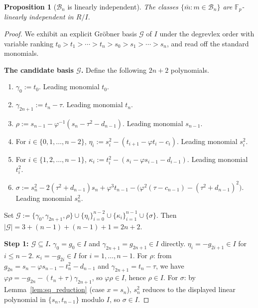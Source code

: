 \documentclass[11pt,a4paper]{article}
\newtheorem{proposition}[theorem]{Proposition}
\theoremstyle{definition}
\newcommand{\F}{\mathbb{F}}
\begin{document}
\begin{proposition}[$\mathcal{B}_n$ is linearly independent]\label{prop:indep}
The classes $\{\bar m : m \in \mathcal{B}_n\}$ are $\F_p$-linearly
independent in $R/I$.
\end{proposition}

\begin{proof}
We exhibit an explicit Gr\"obner basis $\mathcal{G}$ of $I$ under
the degrevlex order with variable ranking $t_0 > t_1 > \cdots >
t_n > s_0 > s_1 > \cdots > s_n$, and read off the standard monomials.

\medskip
\noindent\textbf{The candidate basis $\mathcal{G}$.} Define the
following $2n+2$ polynomials.
\begin{enumerate}[label=(G\arabic*),leftmargin=*]
\item    $\gamma_0 := t_0$.
    Leading monomial $t_0$.
\item    $\gamma_{2n+1} := t_n - \tau$.
    Leading monomial $t_n$.
\item $\rho := s_{n-1} - \varphi^{-1}(s_n - \tau^2 - d_{n-1})$.
    Leading monomial $s_{n-1}$.
\item For $i \in \{0, 1, \ldots, n-2\}$,
    $\eta_i := s_i^2 - (t_{i+1} - \varphi t_i - c_i)$.
    Leading monomial $s_i^2$.
\item For $i \in \{1, 2, \ldots, n-1\}$,
    $\kappa_i := t_i^2 - (s_i - \varphi s_{i-1} - d_{i-1})$.
    Leading monomial $t_i^2$.
\item  $\sigma :=
    s_n^2 - 2(\tau^2 + d_{n-1}) s_n + \varphi^3 t_{n-1}
    - \bigl(\varphi^2(\tau - c_{n-1}) - (\tau^2 + d_{n-1})^2\bigr)$.
    Leading monomial $s_n^2$.
\end{enumerate}
Set $\mathcal{G} := \{\gamma_0, \gamma_{2n+1}, \rho\} \cup
\{\eta_i\}_{i=0}^{n-2} \cup \{\kappa_i\}_{i=1}^{n-1} \cup
\{\sigma\}$. Then $|\mathcal{G}| = 3 + (n-1) + (n-1) + 1 = 2n + 2$.

\medskip
\noindent\textbf{Step 1: $\mathcal{G} \subseteq I$.}
$\gamma_0 = g_0 \in I$ and $\gamma_{2n+1} = g_{2n+1} \in I$ directly.
$\eta_i = -g_{2i+1} \in I$ for $i \leq n-2$. $\kappa_i = -g_{2i} \in I$
for $i = 1, \ldots, n-1$. For $\rho$: from $g_{2n} = s_n - \varphi s_{n-1}
- t_n^2 - d_{n-1}$ and $\gamma_{2n+1} = t_n - \tau$, we have
$\varphi \rho = -g_{2n} - (t_n + \tau) \gamma_{2n+1}$, so
$\varphi \rho \in I$, hence $\rho \in I$. For $\sigma$: by
Lemma~\ref{lem:sq_reduction} (case $x = s_n$), $s_n^2$ reduces to the
displayed linear polynomial in $\{s_n, t_{n-1}\}$ modulo $I$,
so $\sigma \in I$.


\end{proof}
\end{document}
